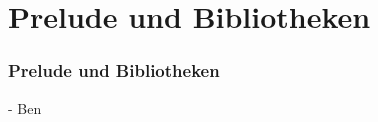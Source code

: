 \section{Prelude und Bibliotheken}

\begin{frame}
\frametitle{Prelude und Bibliotheken}
- Ben
\end{frame}